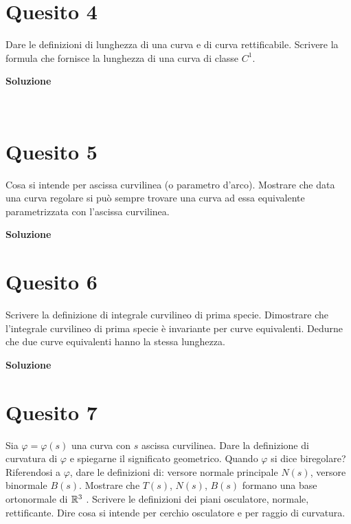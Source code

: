 \section*{Quesito 4}
Dare le definizioni di lunghezza di una curva e di curva rettificabile. Scrivere
la formula che fornisce la lunghezza di una curva di classe $C^1$.


\medskip
\begin{large}
\textbf{Soluzione}
\end{large}\\



\section*{Quesito 5}
Cosa si intende per ascissa curvilinea (o parametro d’arco). Mostrare che data
una curva regolare si può sempre trovare una curva ad essa equivalente parametrizzata
con l’ascissa curvilinea.


\medskip
\begin{large}
\textbf{Soluzione}
\end{large}


\section*{Quesito 6}
Scrivere la definizione di integrale curvilineo di prima specie. Dimostrare che
l’integrale curvilineo di prima specie è invariante per curve equivalenti. Dedurne che due
curve equivalenti hanno la stessa lunghezza.

\medskip
\begin{large}
\textbf{Soluzione}
\end{large}


\section*{Quesito 7}
Sia $\varphi = \varphi(s)$ una curva con $s$ ascissa 
curvilinea. Dare la definizione di curvatura di $\varphi$ e 
spiegarne il significato geometrico. Quando $\varphi$ si dice 
biregolare? Riferendosi a $\varphi$, dare le definizioni di: 
versore normale principale $N(s)$, versore binormale $B(s)$.
Mostrare che $T(s)$, $N(s)$, $B(s)$ formano una base
 ortonormale di $\mathbb{R} ^3$
. Scrivere le definizioni
dei piani osculatore, normale, rettificante. Dire cosa si intende per cerchio osculatore e
per raggio di curvatura.


